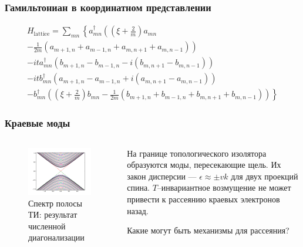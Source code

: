 \documentclass{beamer}
\begin{document}
\begin{frame}
    \frametitle{Гамильтониан в координатном представлении}
    \begin{multline}
        \label{BHZ_tight_binding}
        H_{\mathrm{lattice}} = \sum_{mn} \left\{
            a_{mn}^\dagger\left( \left(\xi + \frac{2}{m}\right) a_{mn} \right.\right.\\
     \left.\left. -\frac{1}{2m}(a_{m+1,n} + a_{m-1,n} + a_{m,n+1} + a_{m,n-1})\right)\right. \\
            -it a_{mn}^\dagger(b_{m+1,n} -b_{m-1,n} - i(b_{m,n+1} - b_{m,n-1}))\\
            -it b_{mn}^\dagger(a_{m+1,n} -a_{m-1,n} + i(a_{m,n+1} - a_{m,n-1}))\\
            -\left. b_{mn}^\dagger\left( \left(\xi + \frac{2}{m}\right) b_{mn}
                     -\frac{1}{2m}(b_{m+1,n} + b_{m-1,n} + b_{m,n+1} + b_{m,n-1})\right) \right\}
    \end{multline}
\end{frame}
    

\begin{frame}
    \frametitle{Краевые моды}
    \begin{columns}[T]
        \begin{column}{0.5\textwidth}
            \begin{figure}[h]
                \includegraphics[width=0.95\linewidth]{edge_states.png}
                \caption{Спектр полосы ТИ: результат численной диагонализации}
            \end{figure}
        \end{column}
        \begin{column}{0.5\textwidth}
            На границе топологического изолятора образуются моды, пересекающие щель.
            Их закон дисперсии --- $\epsilon \approx \pm vk$ для двух проекций спина. 
            $T$--инвариантное возмущение не может привести к рассеянию краевых 
            электронов назад.
    
            Какие могут быть механизмы для рассеяния?
        \end{column}
    \end{columns}
\end{frame}
\end{document}
